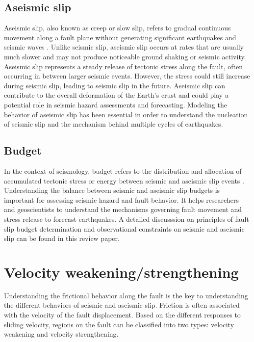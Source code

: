 \subsection{Aseismic slip}
Aseismic slip, also known as creep or slow slip, refers to gradual continuous movement along a fault plane without generating significant earthquakes and seismic waves \citep{cowan1999faults}.
Unlike seismic slip, aseismic slip occurs at rates that are usually much slower and may not produce noticeable ground shaking or seismic activity.
Aseismic slip represents a steady release of tectonic stress along the fault, often occurring in between larger seismic events.
However, the stress could still increase during seismic slip, leading to seismic slip in the future.
Aseismic slip can contribute to the overall deformation of the Earth's crust and could play a potential role in seismic hazard assessments and forecasting.
Modeling the behavior of aseismic slip has been essential in order to understand the nucleation of seismic slip and the mechanism behind multiple cycles of earthquakes.

\subsection{Budget}
In the context of seismology, budget refers to the distribution and allocation of accumulated tectonic stress or energy between seismic and aseismic slip events \citep{https://doi.org/10.1029/GL015i011p01215}.
Understanding the balance between seismic and aseismic slip budgets is important for assessing seismic hazard and fault behavior.
It helps researchers and geoscientists to understand the mechanisms governing fault movement and stress release to forecast earthquakes. A detailed discusssion on principles of fault slip budget determination and observational constraints on seismic and aseismic slip can be found in this review paper\citep{annurev:/content/journals/10.1146/annurev-earth-060614-105302}.


\section{Velocity weakening/strengthening}
Understanding the frictional behavior along the fault is the key to understanding the different behaviors of seismic and aseismic slip.
Friction is often associated with the velocity of the fault displacement.
Based on the different responses to sliding velocity, regions on the fault can be classified into two types: velocity weakening and velocity strengthening.
